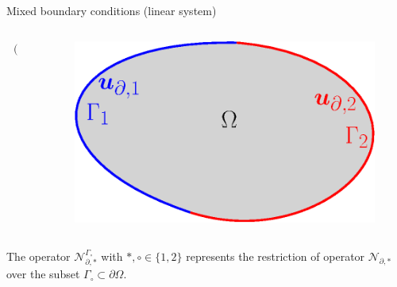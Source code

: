 \documentclass[aspectratio=169]{ISAE-Beamer}
\begin{document}
\begin{frame}{Mixed boundary conditions (linear system)}
\begin{columns}
\begin{column}{0.6\textwidth}
\begin{align*}
\begin{pmatrix}
\end{pmatrix}.
\end{align*}
\end{column}
\begin{column}{0.4\textwidth}
\begin{figure}[tb]
	\centering
	\includegraphics[width=0.9\columnwidth]{part_3/pfem/bound_part.eps}
\end{figure}
\end{column}
\end{columns}

\vspace{1cm}
The operator $\mathcal{N}_{\partial, *}^{\Gamma_\circ}$ with $*, \circ \in \{1, 2\}$ represents the restriction of operator $\mathcal{N}_{\partial, *}$ over the subset $\Gamma_\circ \subset \partial\Omega$.
\end{frame}
\end{document}
